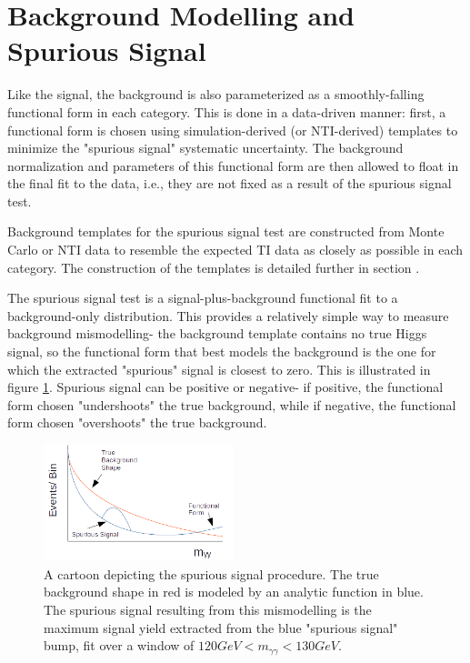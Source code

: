 \section{Background Modelling and Spurious Signal} \label{sec:background_modelling} 

Like the signal, the background is also parameterized as a smoothly-falling functional form in each category. This is done in a data-driven manner: first, a functional form is chosen using simulation-derived (or NTI-derived) templates to minimize the "spurious signal" systematic uncertainty. The background normalization and parameters of this functional form are then allowed to float in the final fit to the data, i.e., they are not fixed as a result of the spurious signal test. 

Background templates for the spurious signal test are constructed from Monte Carlo or NTI data to resemble the expected TI data as closely as possible in each category. The construction of the templates is detailed further in section \label{sec:bkgtemplates}.

The spurious signal test is a signal-plus-background functional fit to a background-only distribution. This provides a relatively simple way to measure background mismodelling- the background template contains no true Higgs signal, so the functional form that best models the background is the one for which the extracted "spurious" signal is closest to zero. This is illustrated in figure \ref{fig:SScartoon}. Spurious signal can be positive or negative- if positive, the functional form chosen "undershoots" the true background, while if negative, the functional form chosen "overshoots" the true background.

\begin{figure}
\includegraphics[width=0.49\textwidth]{figures/sigbkgparam/SSCartoon.png}
\caption{A cartoon depicting the spurious signal procedure. The true background shape in red is modeled by an analytic function in blue. The spurious signal resulting from this mismodelling is the maximum signal yield extracted from the blue "spurious signal" bump, fit over a window of $120 GeV < m_{\gamma \gamma}<130 GeV$.}
\label{fig:SScartoon}
\end{figure} 

